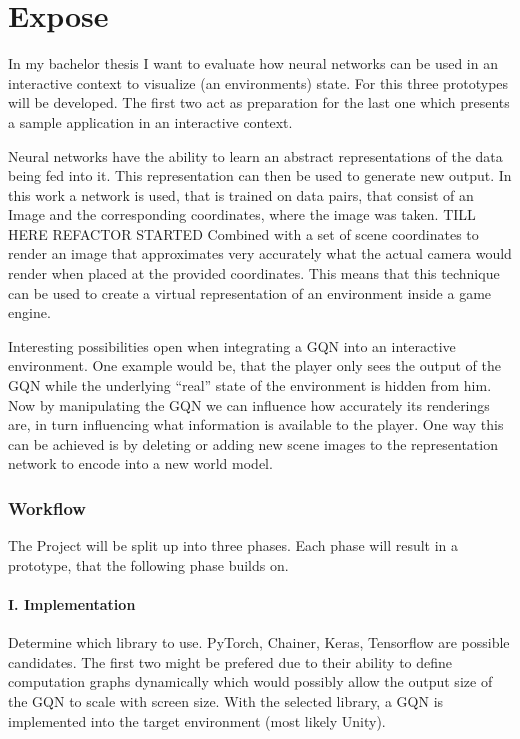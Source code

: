 \documentclass[a4paper, twoside, 10pt]{report}
\begin{document}
\section{Expose}
In my bachelor thesis I want to evaluate how neural networks can be used in an interactive context to visualize (an environments) state. For this three prototypes will be developed. The first two act as preparation for the last one which presents a sample application in an interactive context.

Neural networks have the ability to learn an abstract representations of the data being fed into it. This representation can then be used to generate new output. In this work a network is used, that is trained on data pairs, that consist of an Image and the corresponding coordinates, where the image was taken. {\color{red}TILL HERE REFACTOR STARTED} Combined with a set of scene coordinates to render an image that approximates very accurately what the actual camera would render when placed at the provided coordinates. This means that this technique can be used to create a virtual representation of an environment inside a game engine. 

Interesting possibilities open when integrating a GQN into an interactive environment. One example would be, that the player only sees the output of the GQN while the underlying “real” state of the environment is hidden from him. Now by manipulating the GQN we can influence how accurately its renderings are, in turn influencing what information is available to the player. One way this can be achieved is by deleting or adding new scene images to the representation network to encode into a new world model.

\subsubsection{Workflow}
The Project will be split up into three phases. Each phase will result in a prototype, that the following phase builds on.

\paragraph{I.  Implementation}
Determine which library to use. PyTorch, Chainer, Keras, Tensorflow are possible candidates. The first two might be prefered due to their ability to define computation graphs dynamically which would possibly allow the output size of the GQN to scale with screen size. With the selected library, a GQN is implemented into the target environment (most likely Unity).
\end{document}
